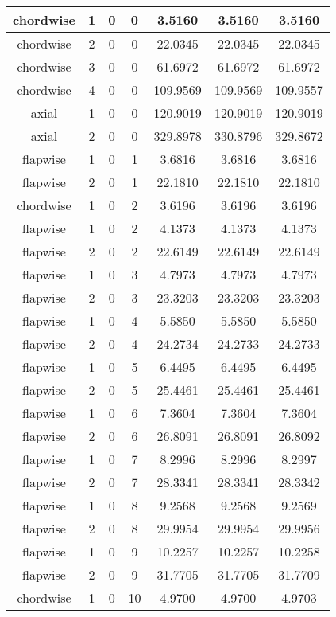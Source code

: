 \begin{center}
\begin{longtable}[!hbt]{|c|c|c|c|c|c|c|}
chordwise & 1 & 0 & 0 & 3.5160 & 3.5160 & 3.5160\\ 
\hline
chordwise & 2 & 0 & 0 & 22.0345 & 22.0345 & 22.0345\\ 
\hline
chordwise & 3 & 0 & 0 & 61.6972 & 61.6972 & 61.6972\\ 
\hline
chordwise & 4 & 0 & 0 & 109.9569 & 109.9569 & 109.9557\\ 
\hline
axial & 1 & 0 & 0 & 120.9019 & 120.9019 & 120.9019\\ 
\hline
axial & 2 & 0 & 0 & 329.8978 & 330.8796 & 329.8672\\ 
\hline
flapwise & 1 & 0 & 1 & 3.6816 & 3.6816 & 3.6816\\ 
\hline
flapwise & 2 & 0 & 1 & 22.1810 & 22.1810 & 22.1810\\ 
\hline
chordwise & 1 & 0 & 2 & 3.6196 & 3.6196 & 3.6196\\ 
\hline
flapwise & 1 & 0 & 2 & 4.1373 & 4.1373 & 4.1373\\ 
\hline
flapwise & 2 & 0 & 2 & 22.6149 & 22.6149 & 22.6149\\ 
\hline
flapwise & 1 & 0 & 3 & 4.7973 & 4.7973 & 4.7973\\ 
\hline
flapwise & 2 & 0 & 3 & 23.3203 & 23.3203 & 23.3203\\ 
\hline
flapwise & 1 & 0 & 4 & 5.5850 & 5.5850 & 5.5850\\ 
\hline
flapwise & 2 & 0 & 4 & 24.2734 & 24.2733 & 24.2733\\ 
\hline
flapwise & 1 & 0 & 5 & 6.4495 & 6.4495 & 6.4495\\ 
\hline
flapwise & 2 & 0 & 5 & 25.4461 & 25.4461 & 25.4461\\ 
\hline
flapwise & 1 & 0 & 6 & 7.3604 & 7.3604 & 7.3604\\ 
\hline
flapwise & 2 & 0 & 6 & 26.8091 & 26.8091 & 26.8092\\ 
\hline
flapwise & 1 & 0 & 7 & 8.2996 & 8.2996 & 8.2997\\ 
\hline
flapwise & 2 & 0 & 7 & 28.3341 & 28.3341 & 28.3342\\ 
\hline
flapwise & 1 & 0 & 8 & 9.2568 & 9.2568 & 9.2569\\ 
\hline
flapwise & 2 & 0 & 8 & 29.9954 & 29.9954 & 29.9956\\ 
\hline
flapwise & 1 & 0 & 9 & 10.2257 & 10.2257 & 10.2258\\ 
\hline
flapwise & 2 & 0 & 9 & 31.7705 & 31.7705 & 31.7709\\ 
\hline
chordwise & 1 & 0 & 10 & 4.9700 & 4.9700 & 4.9703\\ 
\hline

\end{longtable}
\end{center}
